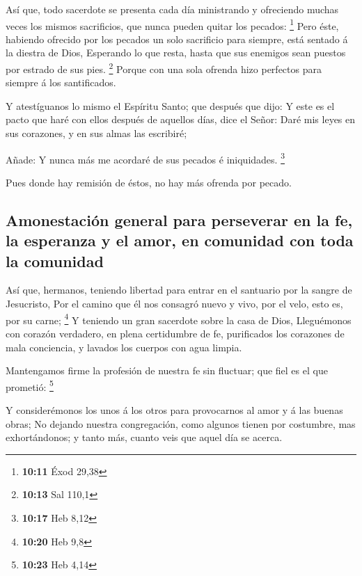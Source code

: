  Así que, todo sacerdote se presenta cada día ministrando y
ofreciendo muchas veces los mismos sacrificios, que nunca pueden quitar
los pecados: \footnote{\textbf{10:11} Éxod 29,38}  Pero
éste, habiendo ofrecido por los pecados un solo sacrificio para siempre,
está sentado á la diestra de Dios,  Esperando lo que resta,
hasta que sus enemigos sean puestos por estrado de sus pies. \footnote{\textbf{10:13}
  Sal 110,1}  Porque con una sola ofrenda hizo perfectos
para siempre á los santificados.

 Y atestíguanos lo mismo el Espíritu Santo; que después que
dijo:  Y este es el pacto que haré con ellos después de
aquellos días, dice el Señor: Daré mis leyes en sus corazones, y en sus
almas las escribiré;

 Añade: Y nunca más me acordaré de sus pecados é
iniquidades. \footnote{\textbf{10:17} Heb 8,12}

 Pues donde hay remisión de éstos, no hay más ofrenda por
pecado.

\hypertarget{amonestaciuxf3n-general-para-perseverar-en-la-fe-la-esperanza-y-el-amor-en-comunidad-con-toda-la-comunidad}{%
\subsection{Amonestación general para perseverar en la fe, la esperanza
y el amor, en comunidad con toda la
comunidad}\label{amonestaciuxf3n-general-para-perseverar-en-la-fe-la-esperanza-y-el-amor-en-comunidad-con-toda-la-comunidad}}

 Así que, hermanos, teniendo libertad para entrar en el
santuario por la sangre de Jesucristo,  Por el camino que
él nos consagró nuevo y vivo, por el velo, esto es, por su carne;
\footnote{\textbf{10:20} Heb 9,8}  Y teniendo un gran
sacerdote sobre la casa de Dios,  Lleguémonos con corazón
verdadero, en plena certidumbre de fe, purificados los corazones de mala
conciencia, y lavados los cuerpos con agua limpia.

 Mantengamos firme la profesión de nuestra fe sin fluctuar;
que fiel es el que prometió: \footnote{\textbf{10:23} Heb 4,14}

 Y considerémonos los unos á los otros para provocarnos al
amor y á las buenas obras;  No dejando nuestra
congregación, como algunos tienen por costumbre, mas exhortándonos; y
tanto más, cuanto veis que aquel día se acerca.

